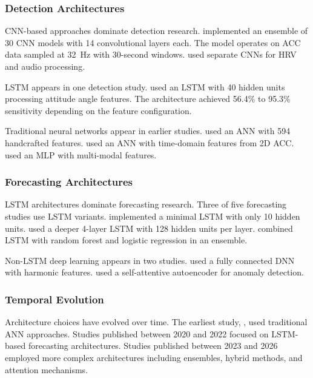 \subsubsection{Detection Architectures}

CNN-based approaches dominate detection research. \textcite{spahrDeepLearningbasedDetection2025} implemented an ensemble of 30 CNN models with 14 convolutional layers each. The model operates on ACC data sampled at 32~Hz with 30-second windows. \textcite{elemamAutomatedValidatedTool2025} used separate CNNs for HRV and audio processing.

LSTM appears in one detection study. \textcite{wangDevelopmentWearableSeizure2025} used an LSTM with 40 hidden units processing attitude angle features. The architecture achieved 56.4\% to 95.3\% sensitivity depending on the feature configuration.

Traditional neural networks appear in earlier studies. \textcite{fineWearableDeviceSeizure2025} used an ANN with 594 handcrafted features. \textcite{borujenyDetectionEpilepticSeizure2013} used an ANN with time-domain features from 2D ACC. \textcite{singhRathoreWearableBasedEpileptic2024} used an MLP with multi-modal features.

\subsubsection{Forecasting Architectures}

LSTM architectures dominate forecasting research. Three of five forecasting studies use LSTM variants. \textcite{meiselMachineLearningWristband2020} implemented a minimal LSTM with only 10 hidden units. \textcite{nasseriAmbulatorySeizureForecasting2021} used a deeper 4-layer LSTM with 128 hidden units per layer. \textcite{stirlingForecastingSeizureLikelihood2021} combined LSTM with random forest and logistic regression in an ensemble.

Non-LSTM deep learning appears in two studies. \textcite{vielufSeizureMonitoringCombined2025} used a fully connected DNN with harmonic features. \textcite{odeDevelopmentEpilepticSeizure2023} used a self-attentive autoencoder for anomaly detection.

\subsubsection{Temporal Evolution}

Architecture choices have evolved over time. The earliest study, \textcite{borujenyDetectionEpilepticSeizure2013}, used traditional ANN approaches. Studies published between 2020 and 2022 focused on LSTM-based forecasting architectures. Studies published between 2023 and 2026 employed more complex architectures including ensembles, hybrid methods, and attention mechanisms.

